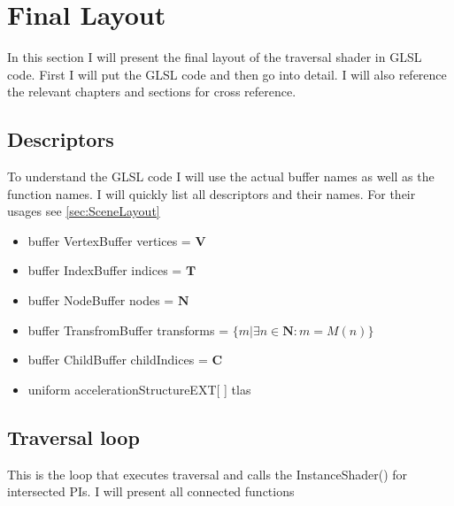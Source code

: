 \section{Final Layout}
\label{sec:FinalLayout}
In this section I will present the final layout of the traversal shader in GLSL code. First I will put the GLSL code and then go into detail. I will also reference the relevant chapters and sections for cross reference.
\subsection{Descriptors}
To understand the GLSL code I will use the actual buffer names as well as the function names. I will quickly list all descriptors and their names. For their usages see \ref{sec:SceneLayout}
\begin{itemize}
    \item buffer VertexBuffer vertices = $\mathbf{V}$
    \item buffer IndexBuffer indices = $\mathbf{T}$
    \item buffer NodeBuffer nodes = $\mathbf{N}$
    \item buffer TransfromBuffer transforms = $\{m | \exists  n \in \mathbf{N} : m = M(n)\}$
    \item buffer ChildBuffer childIndices = $\mathbf{C}$
    \item uniform accelerationStructureEXT[ ] tlas
\end{itemize}

\subsection{Traversal loop}
\label{sec:FinalTraversalLoop}
This is the loop that executes traversal and calls the InstanceShader() for intersected PIs. I will present all connected functions
